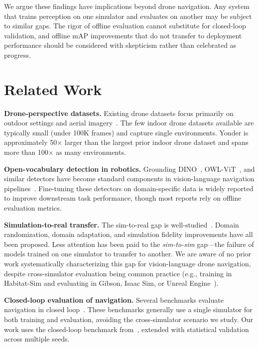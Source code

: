 \documentclass{article}
\begin{document}
We argue these findings have implications beyond drone navigation. Any system that trains perception on one simulator and evaluates on another may be subject to similar gaps. The rigor of offline evaluation cannot substitute for closed-loop validation, and offline mAP improvements that do not transfer to deployment performance should be considered with skepticism rather than celebrated as progress.

\section{Related Work}

\textbf{Drone-perspective datasets.} Existing drone datasets focus primarily on outdoor settings and aerial imagery~\cite{du2018unmanned}. The few indoor drone datasets available are typically small (under 100K frames) and capture single environments. Yonder is approximately 50$\times$ larger than the largest prior indoor drone dataset and spans more than 100$\times$ as many environments.

\textbf{Open-vocabulary detection in robotics.} Grounding DINO~\cite{liu2024grounding}, OWL-ViT~\cite{minderer2023scaling}, and similar detectors have become standard components in vision-language navigation pipelines~\cite{huang2025vlmaps,chaplot2020learning}. Fine-tuning these detectors on domain-specific data is widely reported to improve downstream task performance, though most reports rely on offline evaluation metrics.

\textbf{Simulation-to-real transfer.} The sim-to-real gap is well-studied~\cite{tobin2017domain,sadeghi2017cad2rl}. Domain randomization, domain adaptation, and simulation fidelity improvements have all been proposed. Less attention has been paid to the \textit{sim-to-sim} gap---the failure of models trained on one simulator to transfer to another. We are aware of no prior work systematically characterizing this gap for vision-language drone navigation, despite cross-simulator evaluation being common practice (e.g., training in Habitat-Sim and evaluating in Gibson, Isaac Sim, or Unreal Engine~\cite{savva2019habitat,jacinto2024pegasus}).

\textbf{Closed-loop evaluation of navigation.} Several benchmarks evaluate navigation in closed loop~\cite{anderson2018vision,savva2019habitat}. These benchmarks generally use a single simulator for both training and evaluation, avoiding the cross-simulator scenario we study. Our work uses the closed-loop benchmark from~\cite{anon2026closing}, extended with statistical validation across multiple seeds.
\end{document}
